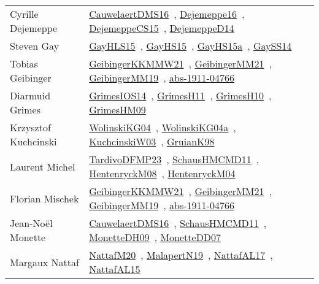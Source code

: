 {\begin{longtable}{p{4cm}p{20cm}}
Cyrille Dejemeppe & \href{works/CauwelaertDMS16.pdf}{CauwelaertDMS16}~\cite{CauwelaertDMS16}, \href{}{Dejemeppe16}~\cite{Dejemeppe16}, \href{works/DejemeppeCS15.pdf}{DejemeppeCS15}~\cite{DejemeppeCS15}, \href{works/DejemeppeD14.pdf}{DejemeppeD14}~\cite{DejemeppeD14}\\
Steven Gay & \href{works/GayHLS15.pdf}{GayHLS15}~\cite{GayHLS15}, \href{works/GayHS15.pdf}{GayHS15}~\cite{GayHS15}, \href{works/GayHS15a.pdf}{GayHS15a}~\cite{GayHS15a}, \href{works/GaySS14.pdf}{GaySS14}~\cite{GaySS14}\\
Tobias Geibinger & \href{works/GeibingerKKMMW21.pdf}{GeibingerKKMMW21}~\cite{GeibingerKKMMW21}, \href{works/GeibingerMM21.pdf}{GeibingerMM21}~\cite{GeibingerMM21}, \href{works/GeibingerMM19.pdf}{GeibingerMM19}~\cite{GeibingerMM19}, \href{works/abs-1911-04766.pdf}{abs-1911-04766}~\cite{abs-1911-04766}\\
Diarmuid Grimes & \href{works/GrimesIOS14.pdf}{GrimesIOS14}~\cite{GrimesIOS14}, \href{works/GrimesH11.pdf}{GrimesH11}~\cite{GrimesH11}, \href{works/GrimesH10.pdf}{GrimesH10}~\cite{GrimesH10}, \href{works/GrimesHM09.pdf}{GrimesHM09}~\cite{GrimesHM09}\\
Krzysztof Kuchcinski & \href{works/WolinskiKG04.pdf}{WolinskiKG04}~\cite{WolinskiKG04}, \href{}{WolinskiKG04a}~\cite{WolinskiKG04a}, \href{works/KuchcinskiW03.pdf}{KuchcinskiW03}~\cite{KuchcinskiW03}, \href{works/GruianK98.pdf}{GruianK98}~\cite{GruianK98}\\
Laurent Michel & \href{works/TardivoDFMP23.pdf}{TardivoDFMP23}~\cite{TardivoDFMP23}, \href{works/SchausHMCMD11.pdf}{SchausHMCMD11}~\cite{SchausHMCMD11}, \href{works/HentenryckM08.pdf}{HentenryckM08}~\cite{HentenryckM08}, \href{works/HentenryckM04.pdf}{HentenryckM04}~\cite{HentenryckM04}\\
Florian Mischek & \href{works/GeibingerKKMMW21.pdf}{GeibingerKKMMW21}~\cite{GeibingerKKMMW21}, \href{works/GeibingerMM21.pdf}{GeibingerMM21}~\cite{GeibingerMM21}, \href{works/GeibingerMM19.pdf}{GeibingerMM19}~\cite{GeibingerMM19}, \href{works/abs-1911-04766.pdf}{abs-1911-04766}~\cite{abs-1911-04766}\\
Jean{-}No{\"{e}}l Monette & \href{works/CauwelaertDMS16.pdf}{CauwelaertDMS16}~\cite{CauwelaertDMS16}, \href{works/SchausHMCMD11.pdf}{SchausHMCMD11}~\cite{SchausHMCMD11}, \href{works/MonetteDH09.pdf}{MonetteDH09}~\cite{MonetteDH09}, \href{works/MonetteDD07.pdf}{MonetteDD07}~\cite{MonetteDD07}\\
Margaux Nattaf & \href{works/NattafM20.pdf}{NattafM20}~\cite{NattafM20}, \href{works/MalapertN19.pdf}{MalapertN19}~\cite{MalapertN19}, \href{works/NattafAL17.pdf}{NattafAL17}~\cite{NattafAL17}, \href{works/NattafAL15.pdf}{NattafAL15}~\cite{NattafAL15}\\

\end{longtable}}
